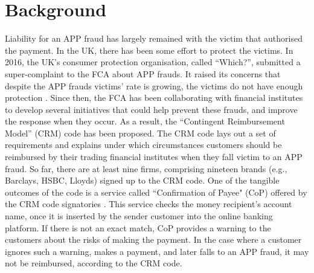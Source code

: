 
\section{Background}\label{sec::background}



Liability for an APP fraud has largely remained with the victim  that authorised the payment.  In the UK,  there has been some effort  to protect the victims. In  2016, the UK's consumer protection organisation, called ``Which?'', submitted a super-complaint to the FCA about  APP frauds. It raised its concerns that despite the APP frauds victims' rate is  growing, the victims do not have enough protection \cite{Which?-super-complaint}.  Since then, the FCA has been collaborating with financial institutes  to develop several initiatives that
could help prevent these frauds, and improve the response when they  occur. As a result,  the ``Contingent Reimbursement Model'' (CRM)  code  \cite{CRM-code} has been proposed. The  CRM code  lays out a set of requirements and explains under which circumstances customers should be reimbursed by their trading financial institutes when they fall victim to an APP fraud. So far,  there are at least nine firms, comprising nineteen brands (e.g., Barclays, HSBC,  Lloyds) signed up to the CRM code. One of the tangible outcomes of the code is a service called ``Confirmation of Payee" (CoP)  offered by the CRM code signatories \cite{CoP}. This service checks the money recipient's account name, once it is inserted by the sender customer into the online banking platform. If there is not an exact match, CoP provides a warning to the  customers about the risks of making the payment. In the case where a customer ignores such a warning, makes a payment, and later falls to an APP fraud,  it may not be reimbursed, according to the CRM code.

